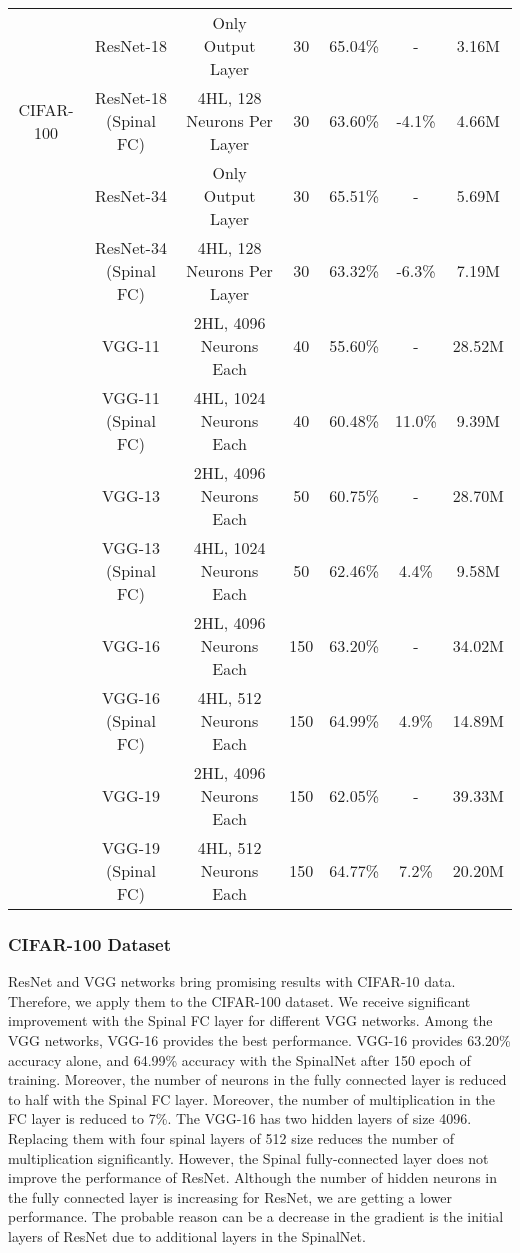 \documentclass[journal]{IEEEtran}
\begin{document}
\begin{table*}
\begin{tabular}{|c|c|c|c|c|c|c|}
      


  & ResNet-18 \cite{he2016deep}&Only Output Layer&30 &65.04\%&- &3.16M\\ \cline{2-7}
   CIFAR-100 & ResNet-18 (Spinal FC) & 4HL, 128 Neurons Per Layer &30 &63.60\%  & -4.1\% &4.66M\\ \cline{2-7}
 
    \cite{krizhevsky2009learning} & ResNet-34 \cite{he2016deep}&Only Output Layer&30 &65.51\%&- &5.69M \\ \cline{2-7}
 & ResNet-34 (Spinal FC) & 4HL, 128 Neurons Per Layer &30 &63.32\%  & -6.3\% &7.19M\\ \cline{2-7}
 
     & VGG-11\cite{simonyan2014very} & 2HL, 4096 Neurons Each &40 &55.60\% &- &28.52M\\ \cline{2-7}
      & VGG-11 (Spinal FC) &4HL, 1024 Neurons Each &40 &60.48\%&11.0\% &9.39M\\ \cline{2-7}
      & VGG-13\cite{simonyan2014very} & 2HL, 4096 Neurons Each &50 &60.75\% &-&28.70M\\ \cline{2-7}
      & VGG-13 (Spinal FC) &4HL, 1024 Neurons Each &50 &62.46\%&4.4\% &9.58M \\ \cline{2-7} 
      & VGG-16\cite{simonyan2014very} & 2HL, 4096 Neurons Each &150 &63.20\% &-&34.02M\\ \cline{2-7}
      & VGG-16 (Spinal FC) &4HL, 512 Neurons Each &150 &64.99\%&4.9\% &14.89M \\ \cline{2-7}
      & VGG-19\cite{simonyan2014very} & 2HL, 4096 Neurons Each &150 &62.05\% &- &39.33M\\ \cline{2-7}
      & VGG-19 (Spinal FC) &4HL, 512 Neurons Each &150 &64.77\%&7.2\% &20.20M \\ \hline 

\end{tabular}


\end{table*}

\subsubsection{CIFAR-100 Dataset}
ResNet and VGG networks bring promising results with CIFAR-10 data. Therefore, we apply them to the CIFAR-100 dataset. We receive significant improvement with the Spinal FC layer for different VGG networks. Among the VGG networks, VGG-16 provides the best performance. VGG-16 provides 63.20\% accuracy alone, and 64.99\% accuracy with the SpinalNet after 150 epoch of training. Moreover, the number of neurons in the fully connected layer is reduced to half with the Spinal FC layer. Moreover, the number of multiplication in the FC layer is reduced to 7\%. The VGG-16 has two hidden layers of size 4096. Replacing them with four spinal layers of 512 size reduces the number of multiplication significantly.
However, the Spinal fully-connected layer does not improve the performance of ResNet. Although the number of hidden neurons in the fully connected layer is increasing for ResNet, we are getting a lower performance. The probable reason can be a decrease in the gradient is the initial layers of ResNet due to additional layers in the SpinalNet.
\end{document}
